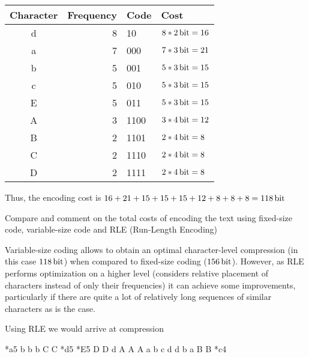 \documentclass{cal}
\begin{document}
{\begin{center} \begin{tabular}{c | r l l}
    \textbf{Character} & \textbf{Frequency} & \textbf{Code} & \textbf{Cost} \\ \hline
    d                  &                  8 & 10            & $8*\SI{2}{\bit}=16$ \\
    a                  &                  7 & 000           & $7*\SI{3}{\bit}=21$ \\
    b                  &                  5 & 001           & $5*\SI{3}{\bit}=15$ \\
    c                  &                  5 & 010           & $5*\SI{3}{\bit}=15$ \\
    E                  &                  5 & 011           & $5*\SI{3}{\bit}=15$ \\
    A                  &                  3 & 1100          & $3*\SI{4}{\bit}=12$ \\
    B                  &                  2 & 1101          & $2*\SI{4}{\bit}=8$ \\
    C                  &                  2 & 1110          & $2*\SI{4}{\bit}=8$ \\
    D                  &                  2 & 1111          & $2*\SI{4}{\bit}=8$ \\
\end{tabular} \end{center}

Thus, the encoding cost is $16+21+15+15+15+12+8+8+8 = \SI{118}{\bit}$

Compare and comment on the total costs of encoding the text using fixed-size code, variable-size code and RLE (Run-Length Encoding)

\ansseparator

Variable-size coding allows to obtain an optimal character-level compression (in this case $\SI{118}{\bit}$) when compared to fixed-size coding ($\SI{156}{\bit}$). However, as RLE performs optimization on a higher level (considers relative placement of characters instead of only their frequencies) it can achieve some improvements, particularly if there are quite a lot of relatively long sequences of similar characters as is the case.

Using RLE we would arrive at compression

\begin{center}
    *a5 b b b C C *d5 *E5 D D d A A A a b c d d b a B B *c4
\end{center}

}
\end{document}
